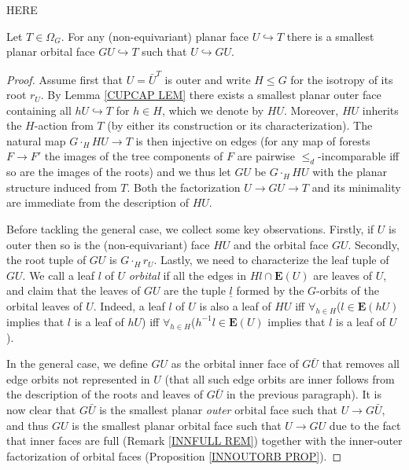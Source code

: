\documentclass[a4paper,10pt
,draft
]{article}%
\begin{document}
{\color{red} HERE}



\begin{proposition}\label{MINGFACT PROP}
	Let $T \in \Omega_G$.
	For any (non-equivariant) planar face $U \hookrightarrow T$ 
	there is a smallest planar orbital face $GU \hookrightarrow T$
	such that $U \hookrightarrow GU$. 
\end{proposition}

\begin{proof}
Assume first that $U=\bar{U}^T$ is outer and write $H\leq G$ for
the isotropy of its root $r_U$.
By Lemma \ref{CUPCAP LEM} there exists a smallest planar outer face 
containing all $h U \hookrightarrow T$ for $h \in H$,
which we denote by $HU$.
Moreover, $HU$ inherits the $H$-action from $T$ 
(by either its construction or its characterization).
The natural map
$G \cdot_H HU \to T$
is then injective on edges
(for any map of forests $F \to F'$
the images of the tree components of $F$ are pairwise $\leq_d$-incomparable iff so are the images of the roots)
and we thus let $GU$ be $G \cdot_H HU$
with the planar structure induced from $T$.
Both the factorization $U \to GU \to T$ and its minimality are immediate from the description of $HU$.

	Before tackling the general case, we collect some key observations.
	Firstly, if $U$ is outer then so is the (non-equivariant) face $HU$ and the orbital face $GU$.
	Secondly, the root tuple of 
	$GU$ is $G\cdot_H r_U$.
	Lastly, we need to characterize the leaf tuple of $GU$. We call a leaf $l$ of $U$ \textit{orbital} if 
all the edges in $Hl \cap \boldsymbol{E}(U)$ are leaves of $U$, 
	and claim that the leaves of $GU$ are the tuple $\underline{l}$ formed by the $G$-orbits of the orbital leaves of $U$. 
	Indeed, a leaf $l$ of $U$ is also a leaf of $HU$ iff 
	$\forall_{h \in H}$($l \in \boldsymbol{E}(hU)$ implies that $l$ is a leaf of $hU$) iff
	$\forall_{h \in H}$($h^{-1} l \in \boldsymbol{E}(U)$ implies that $l$ is a leaf of $U$).
	
	In the general case, we define $GU$ as the orbital inner face of $G \bar{U}$ that removes all edge orbits not represented in $U$ 	(that all such edge orbits are inner follows from the description of the roots and leaves of $G\bar{U}$ in the previous paragraph). 	
	It is now clear that $G\bar{U}$ is the smallest planar \textit{outer} orbital face such that $U \to G\bar{U}$, and thus $GU$ is the smallest planar orbital face such that $U \to G U$
	due to the fact that inner faces are full (Remark \ref{INNFULL REM})
	together with the inner-outer factorization of
	orbital faces (Proposition \ref{INNOUTORB PROP}).
\end{proof}
\end{document}
